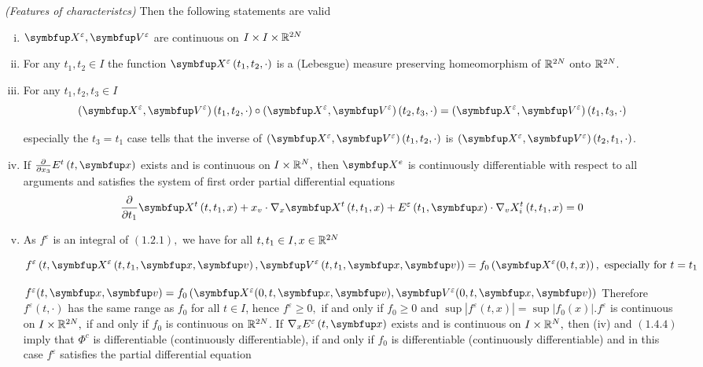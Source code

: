 \begin{lemma}\textit{(Features of characteristcs)}
Then the following statements are valid
\begin{enumerate}[(i)]
    \item $\vect{X}^{\varepsilon},\vect{V}^{\varepsilon}$ are continuous on $I \times I \times {\mathbb{R}}^{2N}$
    \item For any $t_{1}, t_{2} \in I$ the function $\vect{X}^{\varepsilon}\left(t_{1}, t_{2}, \cdot\right)$ is a (Lebesgue) measure preserving homeomorphism of ${\mathbb{R}}^{2N}$ onto ${\mathbb{R}}^{2N}$.
    \item For any $t_{1}, t_{2}, t_{3} \in I$
    $$(\vect{X}^{\varepsilon}, \vect{V}^\varepsilon) \left(t_{1}, t_{2}, \cdot\right) \circ  (\vect{X}^{\varepsilon}, \vect{V}^\varepsilon) \left(t_{2}, t_{3}, \cdot\right)  =(\vect{X}^{\varepsilon}, \vect{V}^\varepsilon)\left(t_{1}, t_{3}, \cdot\right)$$
    
    especially the $t_3 = t_1$ case tells that the inverse of $(\vect{X}^{\varepsilon}, \vect{V}^\varepsilon) \left(t_{1}, t_{2}, \cdot\right)$ is $(\vect{X}^{\varepsilon}, \vect{V}^\varepsilon) \left(t_{2}, t_{1}, \cdot\right)$.
    \item If $\frac{\partial}{\partial x_{3}} E^{t}\left(t,\vx\right)$ exists and is continuous on $I \times {\mathbb{R}}^{N},$ then $\vect{X}^{e}$ is continuously differentiable with respect to all arguments and satisfies the system of first order partial differential equations
    $$\frac{\partial}{\partial t_{1}} \vect{X}^{t}\left(t, t_{1}, x\right)+x_{v} \cdot \nabla_{x} \vect{X}^{t}\left(t, t_{1}, x\right)+E^{\varepsilon}\left(t_{1},\vx\right) \cdot \nabla_{v} X_{i}^{t}\left(t, t_{1}, x\right)=0$$
    \item As $f^{\varepsilon}$ is an integral of $(1.2 .1),$ we have for all $t, t_{1} \in I, x \in {\mathbb{R}}^{2N}$
    
    $$f^{\varepsilon}\left(t, \vect{X}^{\varepsilon}\left(t, t_{1}, \vx, \vv\right), \vect{V}^{\varepsilon}\left(t, t_{1}, \vx, \vv\right)\right)=f_0\left(\vect{X}^{\varepsilon}(0, t, x)\right), \text { especially for } t=t_{1}$$

    $ f^{\varepsilon}(t, \vx, \vv)=f_{0}\left(\vect{X}^{\varepsilon}(0, t, \vx, \vv), \vect{V}^{\varepsilon}(0, t, \vx, \vv)\right)$
    Therefore $f^{\varepsilon}(t, \cdot)$ has the same range as $f_{0}$ for all $t \in I$, hence $f^{\varepsilon} \geqslant 0,$ if and only if $f_{0} \geqslant 0$ and $\sup \left|f^{\varepsilon}(t, x)\right|=\sup |f_{0}(x)| . f^{\varepsilon}$ is continuous on $I \times {\mathbb{R}}^{2N},$ if and only if $f_{0}$ is continuous on ${\mathbb{R}}^{2N}$. If $\nabla_{x} E^{\varepsilon}\left(t,\vx\right)$ exists and is continuous on $I \times {\mathbb{R}}^{N},$ then (iv) and $(1.4 .4)$ imply
    that $\Phi^{c}$ is differentiable (continuously differentiable), if and only if $f_{0}$ is differentiable (continuously differentiable) and in this case $f^{\varepsilon}$ satisfies the partial differential equation


\end{enumerate}
\end{lemma}
